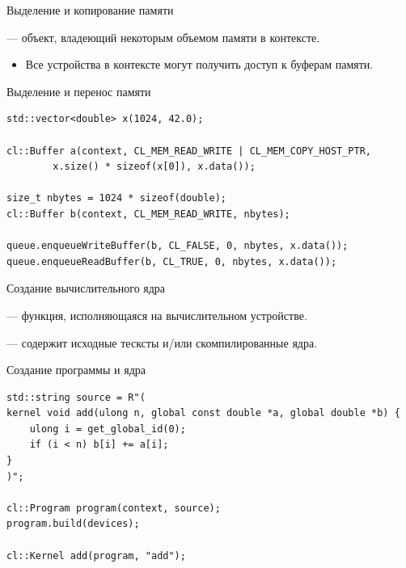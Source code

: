 \documentclass[@BEAMER_OPTIONS@]{beamer}
\begin{document}
\begin{frame}[fragile]{Выделение и копирование памяти}
    \begin{description}[\;\;]
        \item[Буфер памяти] --- объект, владеющий некоторым объемом памяти в
            контексте.
            \begin{itemize}
                \item Все устройства в контексте могут получить доступ к
                    буферам памяти.
            \end{itemize}
    \end{description}
    \begin{exampleblock}{Выделение и перенос памяти}
        \begin{lstlisting}
std::vector<double> x(1024, 42.0);

cl::Buffer a(context, CL_MEM_READ_WRITE | CL_MEM_COPY_HOST_PTR,
        x.size() * sizeof(x[0]), x.data());

size_t nbytes = 1024 * sizeof(double);
cl::Buffer b(context, CL_MEM_READ_WRITE, nbytes);

queue.enqueueWriteBuffer(b, CL_FALSE, 0, nbytes, x.data());
queue.enqueueReadBuffer(b, CL_TRUE, 0, nbytes, x.data());
        \end{lstlisting}
    \end{exampleblock}
\end{frame}

\begin{frame}[fragile]{Создание вычислительного ядра}
    \begin{description}[\;\;]
        \item[Ядро] --- функция, исполняющаяся на вычислительном устройстве.
        \item[Программа] --- содержит исходные тесксты и/или скомпилированные
            ядра.
    \end{description}
    \begin{exampleblock}{Создание программы и ядра}
        \begin{lstlisting}
std::string source = R"(
kernel void add(ulong n, global const double *a, global double *b) {
    ulong i = get_global_id(0);
    if (i < n) b[i] += a[i];
}
)";

cl::Program program(context, source);
program.build(devices);

cl::Kernel add(program, "add");
        \end{lstlisting}
    \end{exampleblock}
\end{frame}
\end{document}
